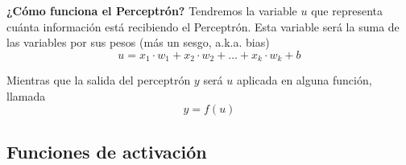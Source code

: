 \textbf{¿Cómo funciona el Perceptrón?} Tendremos la variable $u$ que representa cuánta información está recibiendo el Perceptrón. Esta variable será la suma de las variables por sus pesos (más un sesgo, a.k.a. bias)
\begin{equation}
    u = x_1 \cdot w_1 + x_2 \cdot w_2 + \ldots + x_k \cdot w_k + b
\end{equation}

Mientras que la salida del perceptrón $y$ será $u$ aplicada en alguna función, llamada 
\begin{equation}
    y = f(u)
\end{equation}

\subsection{Funciones de activación}

